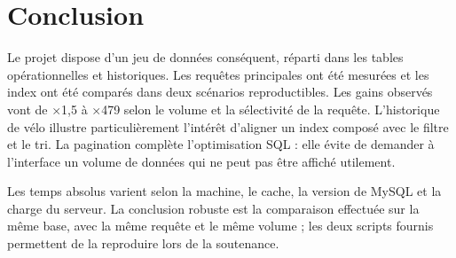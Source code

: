 \documentclass[11pt,a4paper]{article}
\begin{document}
\section{Conclusion}
Le projet dispose d'un jeu de données conséquent, réparti dans les tables opérationnelles et historiques. Les requêtes principales ont été mesurées et les index ont été comparés dans deux scénarios reproductibles. Les gains observés vont de $\times$1,5 à $\times$479 selon le volume et la sélectivité de la requête. L'historique de vélo illustre particulièrement l'intérêt d'aligner un index composé avec le filtre et le tri. La pagination complète l'optimisation SQL : elle évite de demander à l'interface un volume de données qui ne peut pas être affiché utilement.

Les temps absolus varient selon la machine, le cache, la version de MySQL et la charge du serveur. La conclusion robuste est la comparaison effectuée sur la même base, avec la même requête et le même volume ; les deux scripts fournis permettent de la reproduire lors de la soutenance.
\end{document}
